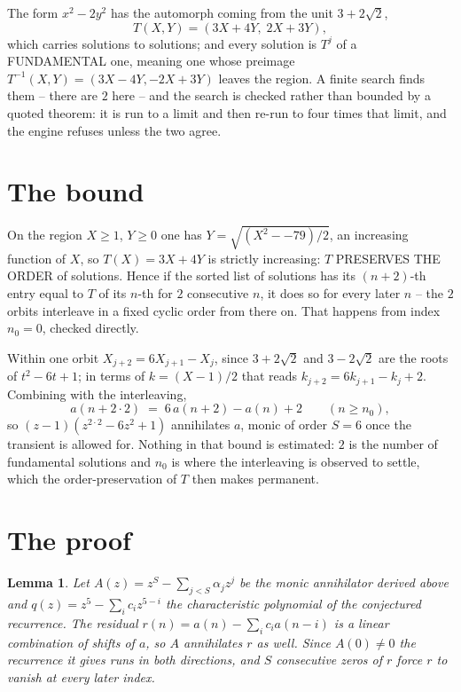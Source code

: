 \documentclass[11pt,a4paper]{article}
\theoremstyle{plain}
\newtheorem{lemma}[theorem]{Lemma}
\theoremstyle{definition}
\begin{document}
The form $x^2-2y^2$ has the automorph coming from the unit $3+2\sqrt2$,
\[
T(X,Y)=(3X+4Y,\;2X+3Y),
\]
which carries solutions to solutions; and every solution is $T^{j}$ of a FUNDAMENTAL one,
meaning one whose preimage $T^{-1}(X,Y)=(3X-4Y,-2X+3Y)$ leaves the region. A finite search
finds them -- there are $2$ here -- and the search is checked rather than bounded by a quoted
theorem: it is run to a limit and then re-run to four times that limit, and the engine refuses
unless the two agree.

\section{The bound}

On the region $X\ge1$, $Y\ge0$ one has $Y=\sqrt{(X^2--79)/2}$, an increasing function of $X$,
so $T(X)=3X+4Y$ is strictly increasing: $T$ PRESERVES THE ORDER of solutions. Hence if the
sorted list of solutions has its $(n+2)$-th entry equal to $T$ of its $n$-th for $2$
consecutive $n$, it does so for every later $n$ -- the $2$ orbits interleave in a fixed cyclic
order from there on. That happens from index $n_0=0$, checked directly.

Within one orbit $X_{j+2}=6X_{j+1}-X_j$, since $3+2\sqrt2$ and $3-2\sqrt2$ are the roots of
$t^2-6t+1$; in terms of $k=(X-1)/2$ that reads $k_{j+2}=6k_{j+1}-k_j+2$. Combining with the
interleaving,
\[
a(n+2\cdot2)\;=\;6\,a(n+2)-a(n)+2 \qquad (n\ge n_0),
\]
so $(z-1)(z^{2\cdot2}-6z^{2}+1)$ annihilates $a$, monic of order $S=6$ once the
transient is allowed for. Nothing in that bound is estimated: $2$ is the number of fundamental
solutions and $n_0$ is where the interleaving is observed to settle, which the order-preservation
of $T$ then makes permanent.

\section{The proof}

\begin{lemma}\label{lem:crit}
Let $A(z)=z^S-\sum_{j<S}\alpha_jz^{j}$ be the monic annihilator derived above and
$q(z)=z^{5}-\sum_ic_iz^{5-i}$ the characteristic polynomial of the conjectured
recurrence. The residual $r(n)=a(n)-\sum_ic_ia(n-i)$ is a linear combination of shifts of $a$,
so $A$ annihilates $r$ as well. Since $A(0)\ne0$ the recurrence it gives runs in both
directions, and $S$ consecutive zeros of $r$ force $r$ to vanish at every later index.
\end{lemma}
\end{document}
